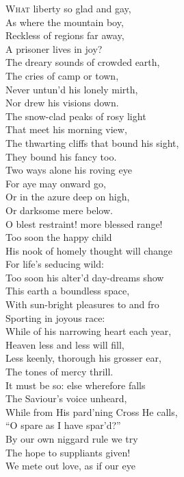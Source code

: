 \textsc{What} liberty so glad and gay, \\
 As where the mountain boy, \\
 Reckless of regions far away, \\
 A prisoner lives in joy? \\
  The dreary sounds of crowded earth, \\
 The cries of camp or town, \\
 Never untun’d his lonely mirth, \\
 Nor drew his visions down. \\
  The snow-clad peaks of rosy light \\
 That meet his morning view, \\
 The thwarting cliffs that bound his sight, \\
 They bound his fancy too. \\
  Two ways alone his roving eye \\
 For aye may onward go, \\
 Or in the azure deep on high, \\
 Or darksome mere below. \\
  O blest restraint! more blessed range! \\
 Too soon the happy child \\
 His nook of homely thought will change \\
 For life’s seducing wild: \\
  Too soon his alter’d day-dreams show \\
 This earth a boundless space, \\
 With sun-bright pleasures to and fro \\
 Sporting in joyous race: \\
  While of his narrowing heart each year, \\
 Heaven less and less will fill, \\
 Less keenly, thorough his grosser ear, \\
 The tones of mercy thrill. \\
  It must be so: else wherefore falls \\
 The Saviour’s voice unheard, \\
 While from His pard’ning Cross He calls, \\
 “O spare as I have spar’d?” \\
  By our own niggard rule we try \\
 The hope to suppliants given! \\
 We mete out love, as if our eye \\
